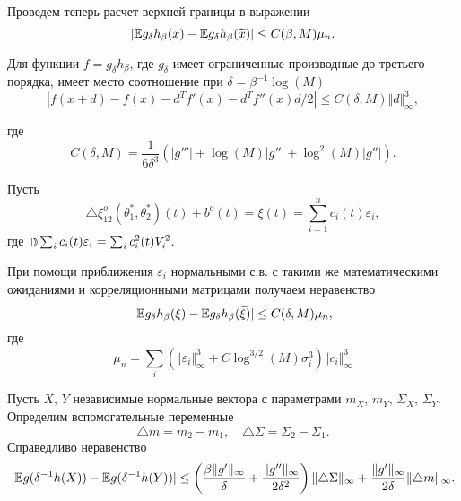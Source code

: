 Проведем теперь расчет верхней границы в выражении
\[
\vert \mathrm{{\mathbb E}} g_{\delta} h_\beta(x)  -  \mathrm{{\mathbb E}} g_{\delta} h_\beta(\widetilde{x}) \vert \leq C(\beta, M) \mu_n.
\] 

\begin{lemma}
Для функции $f = g_{\delta} h_{\beta}$, где $g_{\delta}$ имеет ограниченные производные до третьего порядка, имеет место соотношение при $\delta = \beta^{-1} \log(M)$
\[
\left| f(x + d) - f(x) - d^{T}f'(x) - d^{T}f''(x)d /2 \right |  
\leq C(\delta, M) \Vert d \Vert_{\infty}^{3},
\]
\end{lemma} 
где 
\[
C(\delta, M) =  \frac{1}{6 \delta^3 } (|g'''| + \log(M) |g''| + \log^2(M) |g''|).
\]


Пусть 
\[
\triangle \xi_{12}^{o}(\theta_1^*, \theta_2^*)(t) + b^o(t)  = \xi(t)=
\sum_{i=1}^{n} c_i(t) \varepsilon_i,
\]
где $\mathop{\mathbb{D}}\nolimits \sum_{i} c_i(t) \varepsilon_i = \sum_{i} c_i^2(t) V_i^2$. 

При помощи приближения $\varepsilon_i$ нормальными с.в. с такими же математическими ожиданиями и корреляционными матрицами получаем неравенство
\begin{equation}
\vert \mathrm{{\mathbb E}} g_{\delta} h_\beta(\xi)  -  \mathrm{{\mathbb E}} g_{\delta} h_\beta(\widetilde{\xi}) \vert \leq C(\delta, M) \mu_n,
\end{equation}  
где
\[
\mu_n = \sum_{i} ( \Vert \varepsilon_i \Vert_{\infty}^3 + C \log^{3/2} (M) \sigma_i^3  ) \Vert c_i \Vert_{\infty}^3 
\]


\begin{lemma}
Пусть $X$, $Y$ независимые нормальные вектора с параметрами $m_X$, $m_Y$, $\Sigma_X$, $\Sigma_Y$. 
Определим вспомогательные переменные 
\[
\triangle m = m_2 - m_1,
\quad
\triangle \Sigma = \Sigma_2 - \Sigma_1.
\] 
Справедливо неравенство
\[
| \mathrm{{\mathbb E}} g(\delta^{-1} h(X)) - \mathrm{{\mathbb E}} g(\delta^{-1} h(Y)) | 
\leq 
\left( 
\frac{\beta \Vert g' \Vert_\infty}{\delta} + \frac{\Vert g'' \Vert_\infty }{2 \delta^2}
\right) \Vert \triangle \Sigma \Vert_\infty + 
\frac{ \Vert g' \Vert_\infty}{2 \delta} \Vert \triangle m \Vert_\infty .
\]
\end{lemma}   



    
    